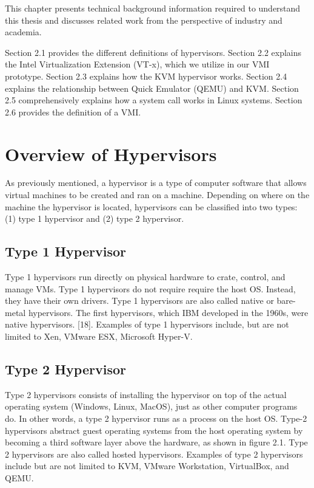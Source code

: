 \documentclass{report}
\begin{document}
\begin{spacing}{1.5}
{\large
This chapter presents technical background information required to understand this
thesis and discusses related work from the perspective of industry and academia. 
\newline
}

{\large
Section 2.1 provides the different definitions of hypervisors. 
Section 2.2 explains the Intel Virtualization Extension (VT-x), which we utilize in our VMI prototype. 
Section 2.3 explains how the KVM hypervisor works. 
Section 2.4 explains the relationship between Quick Emulator (QEMU) and KVM. 
Section 2.5 comprehensively explains how a system call works in Linux systems. 
Section 2.6 provides the definition of a VMI. 
\newline
}









\section{Overview of Hypervisors}

{\large
As previously mentioned, a hypervisor is a type of computer software that allows virtual machines to be created and ran on a machine. Depending on where on the machine the hypervisor is located, hypervisors can be classified into two types: (1) type 1 hypervisor and (2) type 2 hypervisor.
\newline
}

\subsection{Type 1 Hypervisor}

{\large
Type 1 hypervisors run directly on physical hardware to crate, control, and manage VMs. Type 1 hypervisors do not require  require the host OS. Instead, they have their own drivers. Type 1 hypervisors are also called native or bare-metal hypervisors. The first hypervisors, which IBM developed in the 1960s, were native hypervisors. [18]. Examples of type 1 hypervisors include, but are not limited to Xen, VMware ESX, Microsoft Hyper-V.
\newline
}


\subsection{Type 2 Hypervisor}

{\large
Type 2 hypervisors consists of installing the hypervisor on top of the actual operating system (Windows, Linux, MacOS), just as other computer programs do. In other words, a type 2 hypervisor runs as a process on the host OS. Type-2 hypervisors abstract guest operating systems from the host operating system by becoming a third software layer above the hardware, as shown in figure 2.1. Type 2 hypervisors are also called hosted hypervisors. Examples of type 2 hypervisors include but are not limited to KVM, VMware Workstation, VirtualBox, and QEMU.
\newline
}



\end{spacing}
\end{document}

